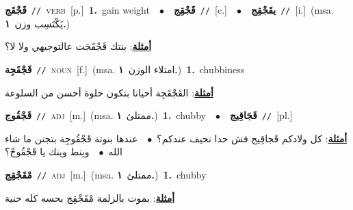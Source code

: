 \documentclass[10pt,a4paper,twoside]{article} %
\begin{document}
\begin{multicols}{2}
{\setlength\topsep{0pt}\textbf{\foreignlanguage{arabic}{قَجْقَج}}\ {\color{gray}\texttt{//}\color{black}}\ \textsc{verb}\ [p.]\ \textbf{1.}~gain weight\ \ $\bullet$\ \ \setlength\topsep{0pt}\textbf{\foreignlanguage{arabic}{قَجْقِج}}\ {\color{gray}\texttt{//}\color{black}}\ [c.]\ \ $\bullet$\ \ \setlength\topsep{0pt}\textbf{\foreignlanguage{arabic}{يقَجْقِج}}\ {\color{gray}\texttt{//}\color{black}}\ [i.]\ \color{gray}(msa. \foreignlanguage{arabic}{يَكْتَسِب وزن}~\foreignlanguage{arabic}{\textbf{١.}})\color{black}\  \begin{flushright}\color{gray}\foreignlanguage{arabic}{\textbf{\underline{\foreignlanguage{arabic}{أمثلة}}}: بنتك قَجْقَجَت عالتوجيهي ولا لا؟}\end{flushright}\color{black}} \vspace{2mm}

{\setlength\topsep{0pt}\textbf{\foreignlanguage{arabic}{قَجْقَجِة}}\ {\color{gray}\texttt{//}\color{black}}\ \textsc{noun}\ [f.]\ \color{gray}(msa. \foreignlanguage{arabic}{امتلاء الوزن}~\foreignlanguage{arabic}{\textbf{١.}})\color{black}\ \textbf{1.}~chubbiness\  \begin{flushright}\color{gray}\foreignlanguage{arabic}{\textbf{\underline{\foreignlanguage{arabic}{أمثلة}}}: القَجْقَجِة أحيانا بتكون حلوة أحسن من السلوعة}\end{flushright}\color{black}} \vspace{2mm}

{\setlength\topsep{0pt}\textbf{\foreignlanguage{arabic}{قَجْقُوج}}\ {\color{gray}\texttt{//}\color{black}}\ \textsc{adj}\ [m.]\ \color{gray}(msa. \foreignlanguage{arabic}{ممتلئ}~\foreignlanguage{arabic}{\textbf{١.}})\color{black}\ \textbf{1.}~chubby\ \ $\bullet$\ \ \setlength\topsep{0pt}\textbf{\foreignlanguage{arabic}{قَجَاقِيج}}\ {\color{gray}\texttt{//}\color{black}}\ [pl.]\  \begin{flushright}\color{gray}\foreignlanguage{arabic}{\textbf{\underline{\foreignlanguage{arabic}{أمثلة}}}: كل ولادكم قَجاقِيج فش حدا نحيف عندكم؟\ $\bullet$\ \  عندها بنوتة قَجْقُوجِة بتجنن ما شاء الله\ $\bullet$\ \  وينط وينك يا قَجْقُوجْ؟}\end{flushright}\color{black}} \vspace{2mm}

{\setlength\topsep{0pt}\textbf{\foreignlanguage{arabic}{مْقَجْقِج}}\ {\color{gray}\texttt{//}\color{black}}\ \textsc{adj}\ [m.]\ \color{gray}(msa. \foreignlanguage{arabic}{ممتلئ}~\foreignlanguage{arabic}{\textbf{١.}})\color{black}\ \textbf{1.}~chubby\  \begin{flushright}\color{gray}\foreignlanguage{arabic}{\textbf{\underline{\foreignlanguage{arabic}{أمثلة}}}: بموت بالزلمة مْقَجْقِج بحسه كله حنية}\end{flushright}\color{black}} \vspace{2mm}


\end{multicols}
\end{document}
